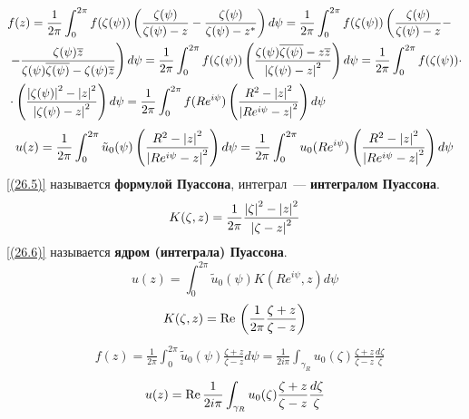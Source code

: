 \begin{align*}
  & f(z) = \frac{1}{2\pi}\int_{0}^{2\pi}f(\zeta(\psi))\left( \frac{\zeta(\psi)}{\zeta(\psi) - z} - \frac{\zeta(\psi)}{\zeta(\psi) - z^*}\right)d\psi = \frac{1}{2\pi}\int_{0}^{2\pi}f(\zeta(\psi))\left( \frac{\zeta(\psi)}{\zeta(\psi) - z} - \right. \\
  & \left. - \frac{\zeta(\psi)\overline{z}}{\zeta(\psi)\overline{\zeta(\psi)} - \zeta(\psi)\overline{z}}\right)d\psi = \frac{1}{2\pi}\int_{0}^{2\pi}f(\zeta(\psi))\left( \frac{\zeta(\psi)\overline{\zeta(\psi)} - z\overline{z}}{\left| \zeta(\psi) - z \right|^2}\right)d\psi = \frac{1}{2\pi}\int_{0}^{2\pi}f(\zeta(\psi))\cdot \\
  & \cdot \left( \frac{\left|{\zeta(\psi)}\right|^2 - \left|{z}\right|^2}{\left| \zeta(\psi) - z \right|^2}\right) d\psi = \frac{1}{2\pi}\int_{0}^{2\pi}f(Re^{i\psi})\left( \frac{R^2 - \left|{z}\right|^2}{\left| Re^{i\psi} - z \right|^2}\right) d\psi
\end{align*}
\begin{equation}\label{(26.5)}
    u(z) = \frac{1}{2\pi}\int_{0}^{2\pi}\tilde{u}_0(\psi)\left( \frac{R^2 - \left|{z}\right|^2}{\left| Re^{i\psi} - z \right|^2}\right) d\psi = \frac{1}{2\pi}\int_{0}^{2\pi}u_0(Re^{i\psi})\left( \frac{R^2 - \left|{z}\right|^2}{\left| Re^{i\psi} - z \right|^2}\right) d\psi
\end{equation}
\eqref{(26.5)} называется \textbf{формулой Пуассона}, интеграл~---
\textbf{интегралом Пуассона}.
\begin{equation}\label{(26.6)}
    K(\zeta,z) = \frac{1}{2\pi} \frac{\left|{\zeta}\right|^2 - \left|{z}\right|^2}{\left| \zeta - z \right|^2}
\end{equation}
\eqref{(26.6)} называется \textbf{ядром (интеграла) Пуассона}.
\begin{equation}\label{(26.7)}
    u(z) = \int_{0}^{2\pi}\tilde{u}_0(\psi)K\left(Re^{i\psi},z\right) d\psi
\end{equation}
\begin{equation}\label{(26.8)}
    K(\zeta,z) = \mathrm{Re}\,\left( \frac{1}{2\pi} \frac{\zeta+z}{ \zeta - z }\right)
\end{equation}
\begin{align*}
  & f(z) = \frac{1}{2\pi}\int_{0}^{2\pi}\tilde{u}_0(\psi)\frac{\zeta+z}{\zeta-z}d\psi = \frac{1}{2i\pi}\int_{\gamma_R}u_0(\zeta)\frac{\zeta+z}{\zeta-z}\frac{d\zeta}{\zeta}
\end{align*}
\begin{equation}\label{(26.9)}
    u(z) = \mathrm{Re}\, \frac{1}{2i\pi}\int_{\gamma_R}u_0(\zeta)\frac{\zeta+z}{\zeta-z}\frac{d\zeta}{\zeta}
\end{equation}
